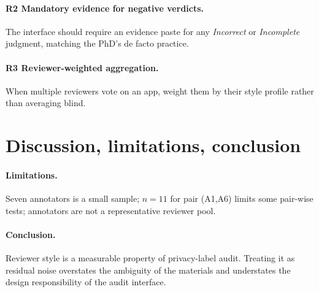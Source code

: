 \documentclass[11pt,a4paper]{article}
\begin{document}
\paragraph{R2 Mandatory evidence for negative verdicts.}
The interface should require an evidence paste for any \emph{Incorrect}
or \emph{Incomplete} judgment, matching the PhD's de facto practice.
\paragraph{R3 Reviewer-weighted aggregation.}
When multiple reviewers vote on an app, weight them by their style
profile rather than averaging blind.

\section{Discussion, limitations, conclusion}
\paragraph{Limitations.} Seven annotators is a small sample;
$n = 11$ for pair (A1,A6) limits some pair-wise tests; annotators are
not a representative reviewer pool.
\paragraph{Conclusion.} Reviewer style is a measurable property of
privacy-label audit. Treating it as residual noise overstates the
ambiguity of the materials and understates the design responsibility
of the audit interface.


\end{document}
